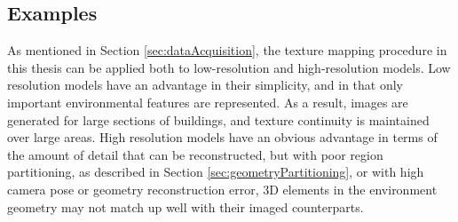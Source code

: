 \documentclass[]{spie}  %
\begin{document}
\subsection{Examples}
\label{sec:examples}
As mentioned in Section \ref{sec:dataAcquisition}, the texture mapping
procedure in this thesis can be applied both to low-resolution and
high-resolution models. Low resolution models have an advantage in
their simplicity, and in that only important environmental features
are represented. As a result, images are generated for large sections
of buildings, and texture continuity is maintained over large
areas. High resolution models have an obvious advantage in terms of
the amount of detail that can be reconstructed, but with poor region
partitioning, as described in Section \ref{sec:geometryPartitioning},
or with high camera pose or geometry reconstruction error, 3D elements
in the environment geometry may not match up well with their imaged
counterparts.
\end{document}
